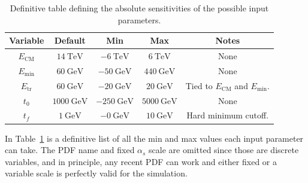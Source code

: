 \begin{table}[ht]
  \centering
  \begin{tabular}{|c|c|c|c|c|}
    \hline
    Variable & Default & Min & Max & Notes \\ \hline
    $E_{\mathrm{CM}}$ & $\qty{14}{\TeV}$ & $\qty{-6}{\TeV}$ & $\qty{+6}{\TeV}$ & None \\ \hline
    $E_{\mathrm{min}}$ & $\qty{60}{\GeV}$ & $\qty{-50}{\GeV}$ & $\qty{+440}{\GeV}$ & None \\ \hline
    $E_{\mathrm{tr}}$ & $\qty{60}{\GeV}$ & $\qty{-20}{\GeV}$ & $\qty{+20}{\GeV}$ & Tied to $E_{\mathrm{CM}}$ and $E_{\mathrm{min}}$. \\ \hline
    $t_0$ & $\qty{1000}{\GeV}$ & $\qty{-250}{\GeV}$ & $\qty{+5000}{\GeV}$ & None \\ \hline
    $t_f$ & $\qty{1}{\GeV}$ & $\qty{-0}{\GeV}$ & $\qty{+10}{\GeV}$ & Hard minimum cutoff. \\ \hline
  \end{tabular}
  \caption{Definitive table defining the absolute sensitivities of the possible input parameters.}
  \label{tbl:input-sensitivities}
\end{table}

In Table~\ref{tbl:input-sensitivities} is a definitive list of all the min and max values each input parameter can take. The PDF name and fixed $\alpha_s$ scale are omitted since those are discrete variables, and in principle, any recent PDF can work and either fixed or a variable scale is perfectly valid for the simulation.


